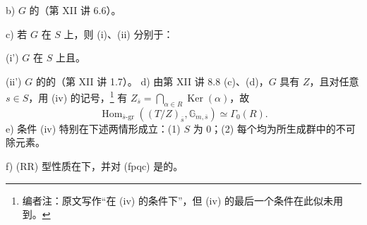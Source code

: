 b) $G$ 的（第 XII 讲 6.6）。

c) 若 $G$ 在 $S$ 上，则 (i)、(ii) 分别于：

(i') $G$ 在 $S$ 上且。

(ii') $G$ 的的（第 XII 讲 1.7）。
d) 由第 XII 讲 8.8 (c)、(d)，$G$ 具有 $Z$，且对任意 $s\in S$，用 (iv) 的记号，\footnote{编者注：原文写作“在 (iv) 的条件下”，但 (iv) 的最后一个条件在此似未用到。} 有 $Z_{\overline s}=\bigcap_{\alpha\in R}\operatorname{Ker}(\alpha)$，故
\[\operatorname{Hom}_{\overline s\text{-gr}}((T/Z)_{\overline s},\mathbb G_{m,\overline s})\simeq\Gamma_0(R).\]
e) 条件 (iv) 特别在下述两情形成立：(1) $S$ 为 $0$；(2) 每个均为所生成群中的不可除元素。

f) (RR) 型性质在下，并对 (fpqc) 是的。

